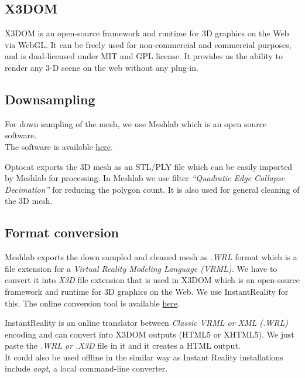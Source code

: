 \documentclass[twoside,12pt,a4paper]{article}
\begin{document}
\subsection{X3DOM}
\label{sub:X3Dom}
X3DOM is an open-source framework and runtime for 3D graphics on the Web via WebGL. It can be freely used for non-commercial and commercial purposes, and is dual-licensed under MIT and GPL license. It provides us the ability to render any 3-D scene on the web without any plug-in.

\subsection{Downsampling} %
\label{sub:downsampling}
For down sampling of the mesh, we use Meshlab which is an open source software.\\
The software is available \href{http://meshlab.sourceforge.net}{here}.

Optocat exports the 3D mesh as an STL/PLY file which can be easily imported by Meshlab for processing. In Meshlab we use filter \textit{“Quadratic Edge Collapse Decimation”} for reducing the polygon count. It is also used for general cleaning of the 3D mesh.


\subsection{Format conversion} %
\label{sub:Format Conversion}
Meshlab exports the down sampled and cleaned mesh as \textit{.WRL}  format which is a file extension for a \textit{Virtual Reality Modeling Language (VRML).} We have to convert it into \textit{X3D} file extension that is used in X3DOM which is an open-source framework and runtime for 3D graphics on the Web. We use InstantReality for this. The online conversion tool is available \href{http://doc.instantreality.org/tools/x3d_encoding_converter/}{here}.

InstantReality is an online translator between \textit{Classic VRML or XML (.WRL)} encoding and can convert into X3DOM outputs (HTML5 or XHTML5).   We just paste the \textit{.WRL or .X3D} file in it and it creates a HTML output. \\
It could also be used offline in the similar way as Instant Reality installations include \textit{aopt}, a local command-line converter.

\end{document}
